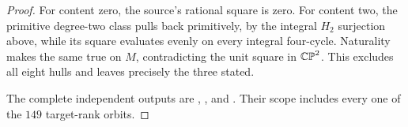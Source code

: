 \begin{proof}
For content zero, the source's rational square is zero.
For content two, the primitive degree-two class pulls back
primitively, by the integral $H_2$ surjection above, while its square
evaluates evenly on every integral four-cycle.  Naturality makes
the same true on $M$, contradicting the unit square in $\mathbb {CP}^2$.
This excludes all eight hulls and leaves precisely the three stated.

The complete independent outputs are
,
, and
.
Their scope includes every one of the $149$ target-rank orbits.
\end{proof}

